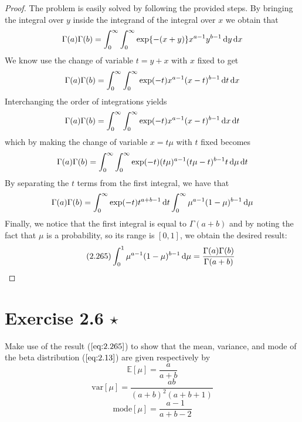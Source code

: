 \begin{proof}
    The problem is easily solved by following the provided steps.
    By bringing the integral over $y$ inside the integrand of 
    the integral over $x$ we obtain that
    \[
        \Gamma(a)\Gamma(b) = \int_{0}^{\infty} \int_{0}^{\infty}
        \exp\{-(x + y)\} x^{a - 1} y^{b - 1} \mathop{}\!\mathrm{d} y \mathop{}\!\mathrm{d} x
    \] 
    We know use the change of variable $t = y+x$ with $x$ fixed
    to get
    \[
        \Gamma(a)\Gamma(b) = \int_{0}^{\infty} \int_{0}^{\infty}
        \exp(-t) x^{a - 1} (x - t)^{b - 1} \mathop{}\!\mathrm{d} t \mathop{}\!\mathrm{d} x
    \] 
    Interchanging the order of integrations yields
    \[
        \Gamma(a)\Gamma(b) = \int_{0}^{\infty} \int_{0}^{\infty}
        \exp(-t) x^{a - 1} (x - t)^{b - 1} \mathop{}\!\mathrm{d} x \mathop{}\!\mathrm{d} t
    \] 
    which by making the change of variable $x = t\mu$ with $t$ fixed
    becomes
    \[
        \Gamma(a)\Gamma(b) = \int_{0}^{\infty} \int_{0}^{\infty}
        \exp(-t) (t\mu)^{a - 1} (t\mu - t)^{b - 1} t \mathop{}\!\mathrm{d} \mu \mathop{}\!\mathrm{d} t
    \] 
    By separating the $t$ terms from the first integral, we have that
     \[
         \Gamma(a)\Gamma(b) = \int_{0}^{\infty} 
         \exp(-t) t^{a + b - 1} \mathop{}\!\mathrm{d} t
         \int_{0}^{\infty} \mu^{a - 1}(1 - \mu)^{b - 1} \mathop{}\!\mathrm{d} \mu
    \] 
    Finally, we notice that the first integral is equal to $\Gamma(a+b)$ 
    and by noting the fact that $\mu$ is a probability, so its
    range is $[0, 1]$, we obtain the desired result:
    \begin{equation}\label{eq:2.265}\tag{2.265}
        \int_{0}^{1} \mu^{a-1}(1 - \mu)^{b - 1} \mathop{}\!\mathrm{d} \mu = \frac{\Gamma(a)\Gamma(b)}{\Gamma(a+b)}
    \end{equation}
\end{proof}

\section*{Exercise 2.6 $\star$} 
Make use of the result ($\ref{eq:2.265}$) to show that the mean,
variance, and mode of the beta distribution ($\ref{eq:2.13}$) are given 
respectively by 
\begin{equation}\label{eq:2.267}\tag{2.267}
    \mathbb{E}[\mu] = \frac{a}{a + b}
\end{equation}
\begin{equation}\label{eq:2.268}\tag{2.268}
    \text{var}[\mu] = \frac{ab}{(a + b)^2(a + b + 1)}
\end{equation}
\begin{equation}\label{eq:2.269}\tag{2.269}
    \text{mode}[\mu] = \frac{a - 1}{a + b - 2}
\end{equation}

